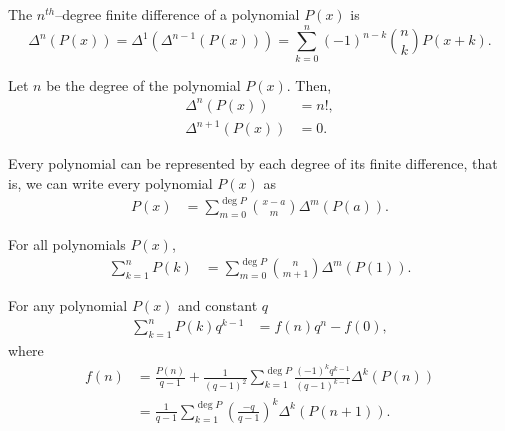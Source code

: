 \begin{definition}
    The $n^{th}$--degree finite difference of a polynomial $P(x)$ is \[\Delta^n(P(x)) = \Delta^1\left(\Delta^{n-1}(P(x))\right) = \sum_{k=0}^n (-1)^{n-k} \binom{n}{k} P(x+k).\]
\end{definition}

\begin{theorem}
    Let $n$ be the degree of the polynomial $P(x)$. Then,
    \begin{align*}
        \Delta^{n}(P(x)) &= n!,\\
        \Delta^{n+1}(P(x)) &= 0.
    \end{align*}
\end{theorem}

\begin{theorem}
    Every polynomial can be represented by each degree of its finite difference, that is,
    we can write every polynomial $P(x)$ as
    \begin{align*}
        P(x) &= \sum_{m=0}^{\deg P} \binom{x-a}{m} \Delta^m(P(a)).
    \end{align*}
\end{theorem}


\begin{theorem}
    For all polynomials $P(x)$,
    \begin{align*}
        \sum_{k=1}^{n} P(k) &= \sum_{m=0}^{\deg P} \binom{n}{m+1} \Delta^m(P(1)).
    \end{align*}
\end{theorem}



\begin{theorem}
    For any polynomial $P(x)$ and constant $q$
    \begin{align*}
        \sum_{k=1}^{n} P(k) q^{k-1} &= f(n)q^n - f(0),
    \end{align*}
    where 
    \begin{align*}
        f(n) &= \frac{P(n)}{q-1} + \frac{1}{(q-1)^2} \sum_{k=1}^{\deg P} \frac{(-1)^kq^{k-1}}{(q-1)^{k-1}} \Delta^k(P(n))\\
        &=  \frac{1}{q-1} \sum_{k=1}^{\deg P} \left(\frac{-q}{q-1}\right)^{k} \Delta^k(P(n+1)). 
    \end{align*}
\end{theorem}



